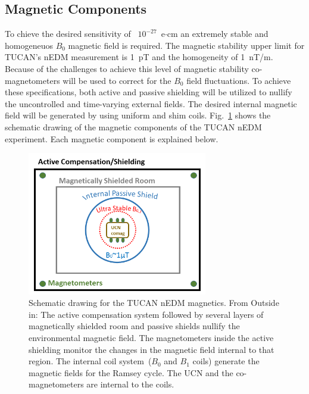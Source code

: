 




\subsection{Magnetic Components}
To chieve the desired sensitivity of ~$10^{-27}$~e$\cdot$cm an
extremely stable and homogeneuos $B_0$ magnetic field is required. The
magnetic stability upper limit for TUCAN's nEDM measurement is 1~pT
and the homogeneity of 1~nT/m. Because of the challenges to achieve
this level of magnetic stability co-magnetometers will be used to
correct for the $B_0$ field fluctuations. To achieve these
specifications, both active and passive shielding will be utilized to
nullify the uncontrolled and time-varying external fields. The desired
internal magnetic field will be generated by using uniform and shim
coils. Fig.~\ref{fig:magneticscheme} shows the schematic drawing of
the magnetic components of the TUCAN nEDM experiment. Each magnetic
component is explained below.

\begin{figure}[h!]
  \centering
  \includegraphics[width=0.7\textwidth]{magneticscheme.png}
  \caption{Schematic drawing for the TUCAN nEDM magnetics. From
    Outside in: The active compensation system followed by several
    layers of magnetically shielded room and passive shields nullify
    the environmental magnetic field. The magnetometers inside the
    active shielding monitor the changes in the magnetic field
    internal to that region. The internal coil system~($B_0$ and $B_1$
    coils) generate the magnetic fields for the Ramsey cycle. The UCN
    and the co-magnetometers are internal to the coils.  }
  \label{fig:magneticscheme}
\end{figure}



